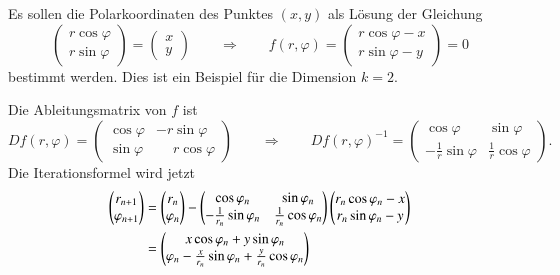 \begin{beispiel}
Es sollen die Polarkoordinaten des Punktes $(x,y)$
%
als Lösung der Gleichung
\[
\begin{pmatrix}
r\cos\varphi\\r\sin\varphi
\end{pmatrix}
=
\begin{pmatrix}x\\y\end{pmatrix}
\qquad\Rightarrow\qquad
f(r,\varphi) =\begin{pmatrix}r\cos\varphi -x \\ r\sin\varphi -y \end{pmatrix}
=0
\]
bestimmt werden.
Dies ist ein Beispiel für die Dimension $k=2$.

Die Ableitungsmatrix von $f$ ist
%
\[
Df(r,\varphi)
=
\begin{pmatrix}
\cos\varphi&-r \sin\varphi\\
\sin\varphi&\phantom{-} r \cos\varphi
\end{pmatrix}
\qquad\Rightarrow\qquad
Df(r,\varphi)^{-1}
=
\begin{pmatrix}
\cos\varphi&\sin\varphi\\
-\frac1r\sin\varphi&\frac1r\cos\varphi
\end{pmatrix}.
\]
Die Iterationsformel wird jetzt
\begin{align}
\begin{pmatrix}
r_{n+1}\\
\varphi_{n+1}
\end{pmatrix}
&=
\begin{pmatrix}r_n\\\varphi_n\end{pmatrix}
-
\begin{pmatrix}
\cos\varphi_n&\sin\varphi_n\\
-\frac1{r_n}\sin\varphi_n&\frac1{r_n}\cos\varphi_n
\end{pmatrix}
\begin{pmatrix}
r_n\cos\varphi_n-x\\
r_n\sin\varphi_n-y
\end{pmatrix}
\notag
\\
&=
\begin{pmatrix}
x\cos\varphi_n+y\sin\varphi_n\\
\varphi_n -\frac{x}{r_n}\sin\varphi_n+\frac{y}{r_n}\cos\varphi_n
\end{pmatrix}
\label{buch:equation:polar}
\end{align}

\end{beispiel}
